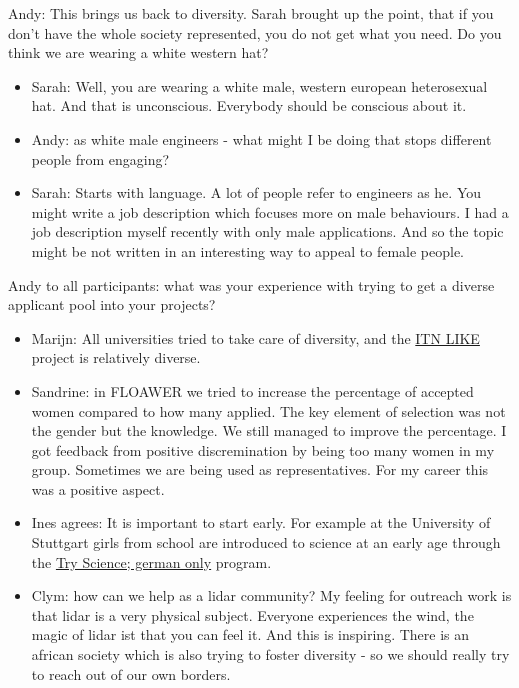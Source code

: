 Andy: This brings us back to diversity. Sarah brought up the point, that if you don't have the whole society represented, you do not get what you need. Do you think we are wearing a white western hat?

\begin{itemize}
	\item Sarah: Well, you are wearing a white male, western european heterosexual hat. And that is unconscious. Everybody should be conscious about it.
	\item Andy: as white male engineers - what might I be doing that stops different people from engaging?
	\item Sarah: Starts with language. A lot of people refer to engineers as he. You might write a job description which focuses more on male behaviours. I had a job description myself recently with only male applications. And so the topic might be not written in an interesting way to appeal to female people.
\end{itemize}

Andy to all participants: what was your experience with trying to get a diverse applicant pool into your projects?

\begin{itemize}
	\item Marijn: All universities tried to take care of diversity, and the \href{https://www.msca-like.eu/}{ITN LIKE} project is relatively diverse.
	\item Sandrine: in FLOAWER we tried to increase the percentage of accepted women compared to how many applied. The key element of selection was not the gender but the knowledge. We still managed to improve the percentage. I got feedback from positive discremination by being too many women in my group. Sometimes we are being used as representatives. For my career this was a positive aspect.
	\item Ines agrees: It is important to start early. For example at the University of Stuttgart girls from school are introduced to science at an early age through the \href{https://www.uni-stuttgart.de/studium/orientierung/try-science/}{Try Science; german only} program.
	\item Clym: how can we help as a lidar community? My feeling for outreach work is that lidar is a very physical subject. Everyone experiences the wind, the magic of lidar ist that you can feel it. And this is inspiring. There is an african society which is also trying to foster diversity - so we should really try to reach out of our own borders.
\end{itemize}

